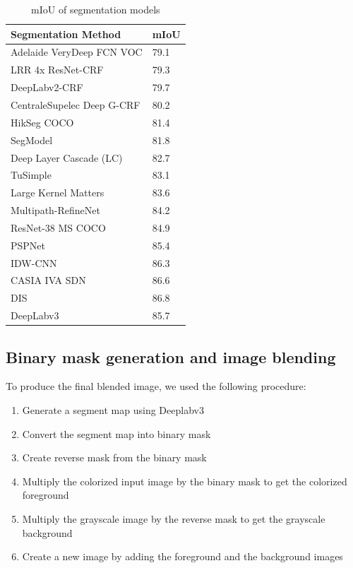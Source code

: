 \documentclass[
]{article}
\providecommand{\tightlist}{%
  \setlength{\itemsep}{0pt}\setlength{\parskip}{0pt}}
\begin{document}
\begin{table}\centering\caption[Pixel intersection-over-union metrics (mIoU) of segmentation models on PASCAL VOC 2012 dataset.]{mIoU of segmentation models}\label{table:miou}\begin{tabular}{ll}
\toprule{}                 Segmentation Method &              mIoU \\
\midrule    Adelaide VeryDeep FCN VOC  & 79.1 \\
LRR 4x ResNet-CRF          & 79.3 \\
DeepLabv2-CRF              & 79.7 \\
CentraleSupelec Deep G-CRF & 80.2 \\
HikSeg COCO                & 81.4 \\
SegModel                   & 81.8 \\
Deep Layer Cascade (LC)    & 82.7 \\
TuSimple                   & 83.1 \\
Large Kernel Matters       & 83.6 \\
Multipath-RefineNet        & 84.2 \\
ResNet-38 MS COCO          & 84.9 \\
PSPNet                     & 85.4 \\
IDW-CNN                    & 86.3 \\
CASIA IVA SDN              & 86.6 \\
DIS                        & 86.8 \\
DeepLabv3                  & 85.7 \\\bottomrule\end{tabular}\end{table}

\hypertarget{binary-mask-generation-and-image-blending}{%
\subsection{Binary mask generation and image
blending}\label{binary-mask-generation-and-image-blending}}

To produce the final blended image, we used the following procedure:

\begin{enumerate}
\def\labelenumi{\arabic{enumi}.}
\tightlist
\item
  Generate a segment map using Deeplabv3
\item
  Convert the segment map into binary mask
\item
  Create reverse mask from the binary mask
\item
  Multiply the colorized input image by the binary mask to get the
  colorized foreground
\item
  Multiply the grayscale image by the reverse mask to get the grayscale
  background
\item
  Create a new image by adding the foreground and the background images
\end{enumerate}
\end{document}
